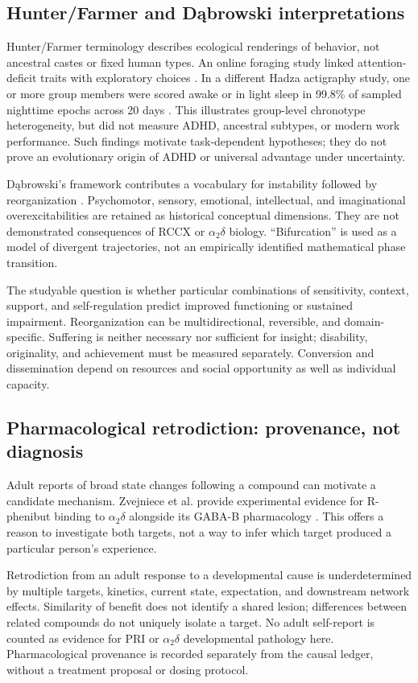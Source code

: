 \subsection{Hunter/Farmer and Dąbrowski interpretations}

Hunter/Farmer terminology describes ecological renderings of behavior, not ancestral castes or fixed human types. An online foraging study linked attention-deficit traits with exploratory choices \cite{ref16}. In a different Hadza actigraphy study, one or more group members were scored awake or in light sleep in 99.8\% of sampled nighttime epochs across 20 days \cite{ref28}. This illustrates group-level chronotype heterogeneity, but did not measure ADHD, ancestral subtypes, or modern work performance. Such findings motivate task-dependent hypotheses; they do not prove an evolutionary origin of ADHD or universal advantage under uncertainty.

Dąbrowski's framework contributes a vocabulary for instability followed by reorganization \cite{ref17}. Psychomotor, sensory, emotional, intellectual, and imaginational overexcitabilities are retained as historical conceptual dimensions. They are not demonstrated consequences of RCCX or \ensuremath{\alpha_2\delta} biology. “Bifurcation” is used as a model of divergent trajectories, not an empirically identified mathematical phase transition.

The studyable question is whether particular combinations of sensitivity, context, support, and self-regulation predict improved functioning or sustained impairment. Reorganization can be multidirectional, reversible, and domain-specific. Suffering is neither necessary nor sufficient for insight; disability, originality, and achievement must be measured separately. Conversion and dissemination depend on resources and social opportunity as well as individual capacity.


\subsection{Pharmacological retrodiction: provenance, not diagnosis}

Adult reports of broad state changes following a compound can motivate a candidate mechanism. Zvejniece et al. provide experimental evidence for R-phenibut binding to \ensuremath{\alpha_2\delta} alongside its GABA-B pharmacology \cite{ref18}. This offers a reason to investigate both targets, not a way to infer which target produced a particular person's experience.

Retrodiction from an adult response to a developmental cause is underdetermined by multiple targets, kinetics, current state, expectation, and downstream network effects. Similarity of benefit does not identify a shared lesion; differences between related compounds do not uniquely isolate a target. No adult self-report is counted as evidence for PRI or \ensuremath{\alpha_2\delta} developmental pathology here. Pharmacological provenance is recorded separately from the causal ledger, without a treatment proposal or dosing protocol.
